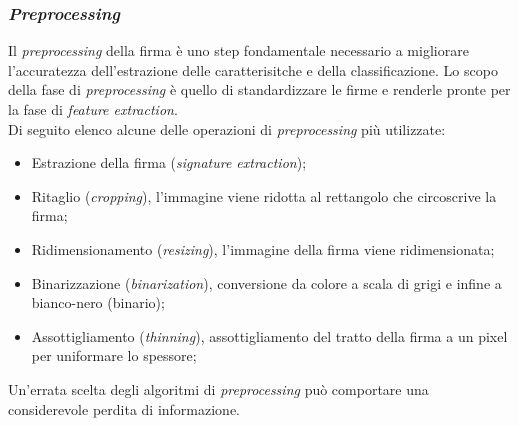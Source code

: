 \subsubsection*{\emph{Preprocessing}}
\label{2.1.3.2}
Il \emph{preprocessing} della firma è uno step fondamentale necessario a migliorare l'accuratezza dell'estrazione delle caratterisitche e della classificazione. Lo scopo della fase di \emph{preprocessing} è quello di standardizzare le firme e renderle pronte per la fase di \emph{feature extraction}.\\ Di seguito elenco alcune delle operazioni di \emph{preprocessing} più utilizzate:
\begin{itemize}
\item Estrazione della firma (\emph{signature extraction});
\item Ritaglio (\emph{cropping}), l'immagine viene ridotta al rettangolo che circoscrive la firma;
\item Ridimensionamento (\emph{resizing}), l'immagine della firma viene ridimensionata;
\item Binarizzazione (\emph{binarization}), conversione da colore a scala di grigi e infine a bianco-nero (binario);
\item Assottigliamento (\emph{thinning}), assottigliamento del tratto della firma a un pixel per uniformare lo spessore;
\end{itemize}
Un'errata scelta degli algoritmi di \emph{preprocessing} può comportare una considerevole perdita di informazione.


